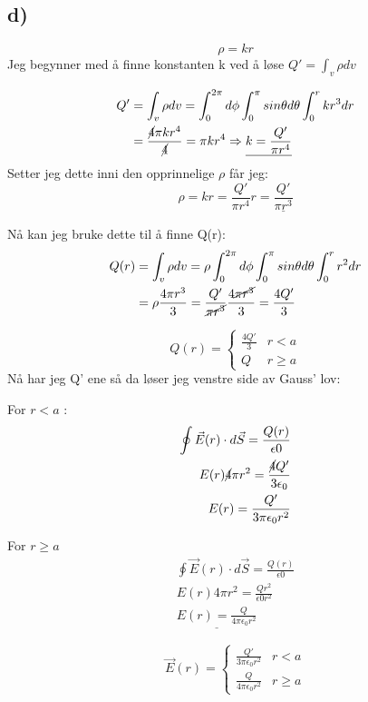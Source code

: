 \documentclass[a4paper,12pt,norsk]{article}
\begin{document}
\subsection{d)}
$$\rho = kr$$
Jeg begynner med å finne konstanten k ved å løse $Q' = \int_v\rho dv$

\begin{align*}
Q' &= \int_v \rho dv = \int^{2\pi}_0d\phi \int^{\pi}_0sin\theta d\theta \int^r_0 kr^3 dr\\
&= \frac{\cancel{4}\pi kr^4}{\cancel{4}} =\pi kr^4 \Rightarrow \underline{k = \frac{Q'}{\pi r^4}}
\end{align*}
Setter jeg dette inni den opprinnelige $\rho$ får jeg:
$$\rho = kr = \frac{Q'}{\pi r^4}r = \underline{\frac{Q'}{\pi r^3}} $$

Nå kan jeg bruke dette til å finne Q(r):
\begin{align*}
Q(r) &= \int_v \rho dv = \rho \int^{2\pi}_0d\phi \int^{\pi}_0sin\theta d\theta \int^r_0 r^2 dr \\
&=\rho \frac{4\pi r^3}{3} =\frac{Q'}{\cancel{\pi r^3}} \frac{4\cancel{\pi r^3}}{3} = \frac{4Q'}{3}\\
\end{align*}

\[ Q(r) = \begin{cases}
\frac{4Q'}{3} & r < a\\
 Q &  r \geq a
\end{cases}\]
Nå har jeg Q' ene så da løser jeg venstre side av Gauss' lov:

For $r<a$ :
\begin{align*}
\oint \vec{E}(r) \cdot d\vec{S} = \frac{Q(r)}{\epsilon0}\\
E(r)\cancel{4}\pi r^2 = \frac{\cancel{4}Q'}{3\epsilon_0}\\
E(r) =  \frac{Q'}{3\pi \epsilon_0 r^2}
\end{align*}

For $r\geq a$
\begin{align*}
\oint \vec{E}(r) \cdot d\vec{S} = \frac{Q(r)}{\epsilon0}\\
E(r)4\pi r^2 = \frac{Qr^2}{\epsilon0r^2} \\
\underline{E(r) = \frac{Q}{4\pi \epsilon_0 r^2}}
\end{align*}

\[ \vec{E}(r) = \begin{cases}
 \frac{Q'}{3\pi \epsilon_0 r^2} & r < a\\
 \frac{Q}{4\pi \epsilon_0 r^2} &  r \geq a
\end{cases}\]
\end{document}
